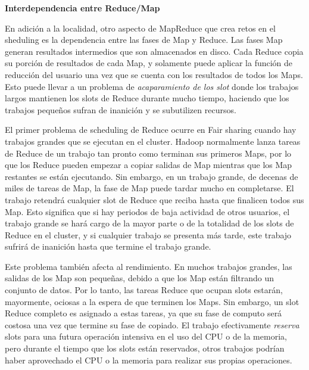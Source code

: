 \begin{center}
	\textbf{Interdependencia entre Reduce/Map}
\end{center}
 
En adición a la localidad, otro aspecto de MapReduce que crea retos en el sheduling es la dependencia entre las fases de Map y Reduce. Las fases Map generan resultados intermedios que son almacenados en disco. Cada Reduce copia su porción de resultados de cada Map, y solamente puede aplicar la función de reducción del usuario una vez que se cuenta con los resultados de todos los Maps. Esto puede llevar a un problema de \textit{acaparamiento de los slot} donde los trabajos largos mantienen los slots de Reduce durante mucho tiempo, haciendo que los trabajos pequeños sufran de inanición y se subutilizen recursos.

El primer problema de scheduling de Reduce ocurre en Fair sharing cuando hay trabajos grandes que se ejecutan en el cluster. Hadoop normalmente lanza tareas de Reduce de un trabajo tan pronto como terminan sus primeros Maps, por lo que los Reduce pueden empezar a copiar salidas de Map mientras que los Map restantes se están ejecutando. Sin embargo, en un trabajo grande, de decenas de miles de tareas de Map, la fase de Map puede tardar mucho en completarse. El trabajo retendrá cualquier slot de Reduce que reciba hasta que finalicen todos sus Map. Esto significa que si hay periodos de baja actividad de otros usuarios, el trabajo grande se hará cargo de la mayor parte o de la totalidad de los slots de Reduce en el cluster, y si cualquier trabajo se presenta más tarde, este trabajo sufrirá de inanición hasta que termine el trabajo grande.

Este problema también afecta al rendimiento. En muchos trabajos grandes, las salidas de los Map son pequeñas, debido a que los Map están filtrando un conjunto de datos. Por lo tanto, las tareas Reduce que ocupan slots estarán, mayormente, ociosas a la espera de que terminen los Maps. Sin embargo, un slot Reduce completo es asignado a estas tareas, ya que su fase de computo será costosa una vez que termine su fase de copiado. El trabajo efectivamente \textit{reserva} slots para una futura operación intensiva en el uso del CPU o de la memoria, pero durante el tiempo que los slots están reservados, otros trabajos podrían haber aprovechado el CPU o la memoria para realizar sus propias operaciones.

